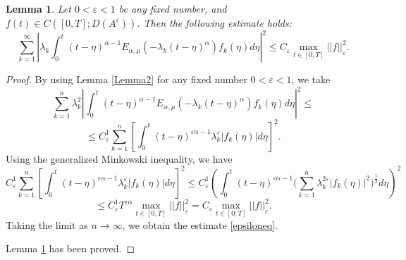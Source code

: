 \documentclass[10pt,a4paper]{amsart}
\newtheorem{lem}{Lemma}
\begin{document}
\begin{lem}\label{Lemma6}
Let $0<\varepsilon<1$ be any fixed number, and $f(t) \in C([0,T];D(A^\varepsilon))$. Then the following estimate holds:
\begin{equation}\label{epsiloneq}
  \sum_{k=1}^\infty \left| \lambda_k\int_0^t (t-\eta)^{\alpha-1} E_{\alpha,\mu}(-\lambda_k (t-\eta)^\alpha)f_k(\eta) d\eta\right|^2\leq C_\varepsilon \max_{t\in[0,T]}||f||_\varepsilon^2.
\end{equation}
\end{lem}

\begin{proof}
 By using Lemma \ref{Lemma2} for any fixed number $0<\varepsilon<1$, we take
$$
\sum_{k=1}^n \lambda_k^2 \left|\int_0^t (t-\eta)^{\alpha-1}E_{\alpha,\mu}(-\lambda_k (t-\eta)^\alpha)f_k(\eta) d\eta\right|^2\leq
$$
$$\leq C^1_\varepsilon\sum_{k=1}^n  \left[\int_0^t (t-\eta)^{\varepsilon\alpha-1}\lambda_k^\varepsilon |f_k(\eta)| d\eta\right]^2.$$
Using the generalized Minkowski inequality, we have
$$C^1_\varepsilon\sum_{k=1}^n  \left[\int_0^t (t-\eta)^{\varepsilon\alpha-1}\lambda_k^\varepsilon |f_k(\eta)| d\eta\right]^2\leq C^1_\varepsilon\left(\int_0^t (t-\eta)^{\varepsilon \alpha-1}\bigg(\sum_{k=1}^n \lambda_k^{2\varepsilon} |f_k(\eta)|^2\bigg)^{\frac{1}{2}} d\eta\right)^2
$$
$$
\leq C^1_\varepsilon T^{\varepsilon\alpha}\max_{t\in[0,T]} ||f||_\varepsilon^2=C_\varepsilon \max_{t \in[0;T]}||f||_\varepsilon^2.
$$
Taking the limit as $n \rightarrow \infty$, we obtain the estimate \eqref{epsiloneq}.

Lemma \ref{Lemma6} has been proved.
\end{proof}
\end{document}
